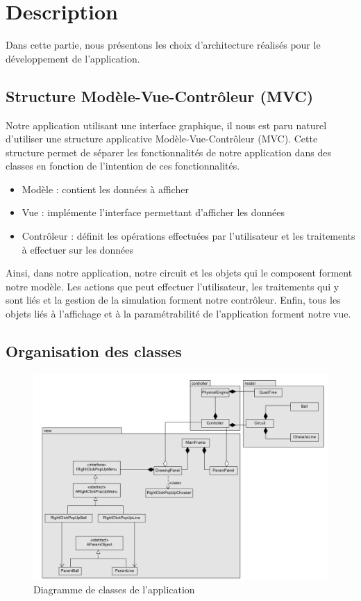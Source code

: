 \documentclass{report}
\begin{document}
\section{Description}

Dans cette partie, nous présentons les choix d'architecture réalisés pour le développement de l'application.

\subsection{Structure Modèle-Vue-Contrôleur (MVC)}

Notre application utilisant une interface graphique, il nous est paru naturel d'utiliser une structure applicative Modèle-Vue-Contrôleur (MVC). Cette structure permet de séparer les fonctionnalités de notre application dans des classes en fonction de l'intention de ces fonctionnalités. 
\begin{itemize}
\item Modèle : contient les données à afficher
\item Vue : implémente l'interface permettant d'afficher les données
\item Contrôleur : définit les opérations effectuées par l'utilisateur et les traitements à effectuer sur les données
\end{itemize}

Ainsi, dans notre application, notre circuit et les objets qui le composent forment notre modèle. Les actions que peut effectuer l'utilisateur, les traitements qui y sont liés et la gestion de la simulation forment notre contrôleur. Enfin, tous les objets liés à l'affichage et à la paramétrabilité de l'application forment notre vue.

\subsection{Organisation des classes}

\begin{figure}[H]
\centering
\includegraphics[scale=0.65]{uml.png}
\caption{Diagramme de classes de l'application}
\end{figure}
\end{document}
